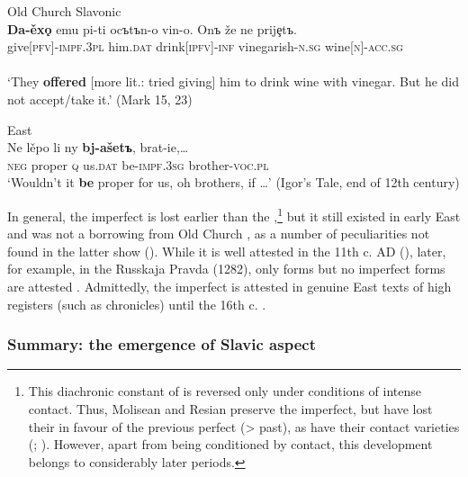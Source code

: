 \documentclass[output=paper]{langsci/langscibook}
\begin{document}
\ea
    \label{ex:wiemerserzant:12}
 {Old Church Slavonic} \\ 
\gll \textbf{Da-ěx\k{o}}           emu                   pi-ti                             ocъtъn-o         vin-o. {On}{ъ} {že ne prijȩt}{ъ}. \\
      give[\textsc{pfv}]-\textsc{impf.3pl} him\textsc{.dat} drink\textsc{[ipfv]}-\textsc{inf} vinegarish-\textsc{n.sg}   wine\textsc{[n]}-\textsc{acc.sg} \\
%
 \\
\glt ‘They \textbf{offered} [more lit.: tried giving] him to drink wine with vinegar. But he did not accept/take it.’ (Mark 15, 23)
\z

\ea
    \label{ex:wiemerserzant:13}
   East  \\
\gll Ne   lěpo     li     ny \textbf{bj-ašetъ},         brat-ie,…\\
\textsc{neg} proper   \textsc{q} us\textsc{.dat} be-\textsc{impf.3sg} brother-\textsc{voc.pl}\\
\glt ‘Wouldn’t it \textbf{be} proper for us, oh brothers, if …’ (Igor’s Tale, end of 12th century)
\z


In general, the imperfect is lost earlier than the ,\footnote{This diachronic constant of  is reversed only under conditions of intense contact. Thus, Molisean and Resian  preserve the imperfect, but have lost their  in favour of the previous perfect ({\textgreater} past), as have their  contact varieties (\citealt[41--43]{Breu2005}; \citeyear[71–72]{Breu2006}). However, apart from being conditioned by contact, this development belongs to considerably later periods.} but it still existed in early East  and was not a borrowing from Old Church , as a number of peculiarities not found in the latter show (\citealt[172]{Maslov2004[1954]}). While it is well attested in the 11th c. AD (\citealt[68–69]{Silina1982}), later, for example, in the Russkaja Pravda (1282), only  forms but no imperfect forms are attested \citep[388]{Ivanov1964}. Admittedly, the imperfect is attested in genuine East  texts of high registers (such as chronicles) until the 16th c. \citep[220]{Kiparsky1967}.

\subsubsection{Summary: the emergence of Slavic aspect}\label{sec:wiemerserzant:3.2.6}
\end{document}
